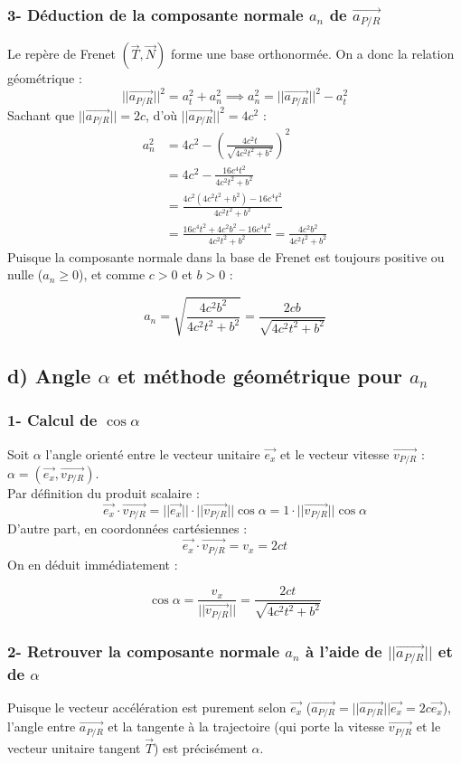 \documentclass[11pt,a4paper]{article}
\begin{document}
\subsubsection*{3- Déduction de la composante normale $a_n$ de $\vec{a_{P/R}}$}
Le repère de Frenet $(\vec{T}, \vec{N})$ forme une base orthonormée. On a donc la relation géométrique :
$$ ||\vec{a_{P/R}}||^2 = a_t^2 + a_n^2 \implies a_n^2 = ||\vec{a_{P/R}}||^2 - a_t^2 $$
Sachant que $||\vec{a_{P/R}}|| = 2c$, d'où $||\vec{a_{P/R}}||^2 = 4c^2$ :
\begin{align*}
a_n^2 &= 4c^2 - \left(\frac{4c^2 t}{\sqrt{4c^2 t^2 + b^2}}\right)^2 \\
&= 4c^2 - \frac{16c^4 t^2}{4c^2 t^2 + b^2} \\
&= \frac{4c^2 (4c^2 t^2 + b^2) - 16c^4 t^2}{4c^2 t^2 + b^2} \\
&= \frac{16c^4 t^2 + 4c^2 b^2 - 16c^4 t^2}{4c^2 t^2 + b^2} = \frac{4c^2 b^2}{4c^2 t^2 + b^2}
\end{align*}
Puisque la composante normale dans la base de Frenet est toujours positive ou nulle ($a_n \ge 0$), et comme $c > 0$ et $b > 0$ :
\begin{sonucbox}
$$ a_n = \sqrt{\frac{4c^2 b^2}{4c^2 t^2 + b^2}} = \frac{2cb}{\sqrt{4c^2 t^2 + b^2}} $$
\end{sonucbox}

\subsection*{d) Angle $\alpha$ et méthode géométrique pour $a_n$}

\subsubsection*{1- Calcul de $\cos\alpha$}
Soit $\alpha$ l'angle orienté entre le vecteur unitaire $\vec{e_x}$ et le vecteur vitesse $\vec{v_{P/R}}$ : $\alpha = (\vec{e_x}, \vec{v_{P/R}})$. \\
Par définition du produit scalaire :
$$ \vec{e_x} \cdot \vec{v_{P/R}} = ||\vec{e_x}|| \cdot ||\vec{v_{P/R}}|| \cos\alpha = 1 \cdot ||\vec{v_{P/R}}|| \cos\alpha $$
D'autre part, en coordonnées cartésiennes :
$$ \vec{e_x} \cdot \vec{v_{P/R}} = v_x = 2ct $$
On en déduit immédiatement :
\begin{sonucbox}
$$ \cos\alpha = \frac{v_x}{||\vec{v_{P/R}}||} = \frac{2ct}{\sqrt{4c^2 t^2 + b^2}} $$
\end{sonucbox}

\subsubsection*{2- Retrouver la composante normale $a_n$ à l'aide de $||\vec{a_{P/R}}||$ et de $\alpha$}
Puisque le vecteur accélération est purement selon $\vec{e_x}$ ($\vec{a_{P/R}} = ||\vec{a_{P/R}}||\vec{e_x} = 2c\vec{e_x}$), l'angle entre $\vec{a_{P/R}}$ et la tangente à la trajectoire (qui porte la vitesse $\vec{v_{P/R}}$ et le vecteur unitaire tangent $\vec{T}$) est précisément $\alpha$.
\end{document}
